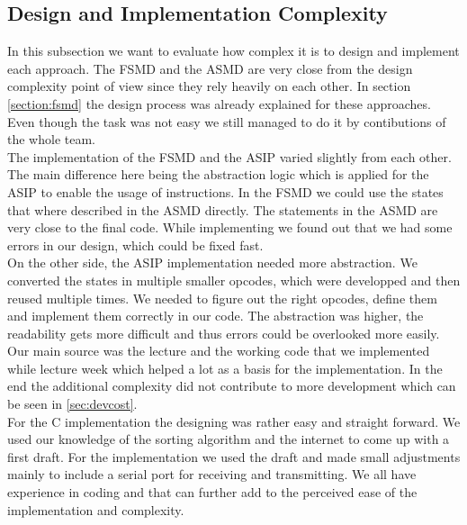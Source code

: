 \documentclass[conference]{IEEEtran}
\begin{document}
\subsection{Design and Implementation Complexity}
In this subsection we want to evaluate how complex it is to design and implement each approach. The FSMD and the ASMD are very close from the design complexity point of view since they rely heavily on each other. In section \ref{section:fsmd} the design process was already explained for these approaches. Even though the task was not easy we still managed to do it by contibutions of the whole team.\\
The implementation of the FSMD and the ASIP varied slightly from each other. The main difference here being the abstraction logic which is applied for the ASIP to enable the usage of instructions. In the FSMD we could use the states that where described in the ASMD directly. The statements in the ASMD are very close to the final code. While implementing we found out that we had some errors in our design, which could be fixed fast.\\ 
On the other side, the ASIP implementation needed more abstraction. We converted the states in multiple smaller opcodes, which were developped and then reused multiple times. We needed to figure out the right opcodes, define them and implement them correctly in our code. The abstraction was higher, the readability gets more difficult and thus errors could be overlooked more easily. Our main source was the lecture and the working code that we implemented while lecture week which helped a lot as a basis for the implementation. In the end the additional complexity did not contribute to more development which can be seen in \ref{sec:devcost}.\\
For the C implementation the designing was rather easy and straight forward. We used our knowledge of the sorting algorithm and the internet to come up with a first draft. For the implementation we used the draft and made small adjustments mainly to include a serial port for receiving and transmitting. We all have experience in coding and that can further add to the perceived ease of the implementation and complexity. \\
\end{document}
